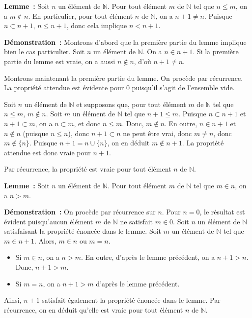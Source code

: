    \done 

\medskip

\noindent\textbf{Lemme :} 
    Soit $n$ un élément de $\mathbb{N}$. 
    Pour tout élément $m$ de $\mathbb{N}$ tel que $n \leq m$, on a $m \notin n$.
    En particulier, pour tout élément $n$ de $\mathbb{N}$, on a $n+1 \neq n$. 
    Puisque $n \subset n+1$, $n \leq n+1$, donc cela implique $n < n+1$. 

\medskip

\noindent\textbf{Démonstration :} 
    Montrons d'abord que la première partie du lemme implique bien le cas particulier. 
    Soit $n$ un élément de $\mathbb{N}$. 
    On a $n \in n+1$. 
    Si la première partie du lemme est vraie, on a aussi $n \notin n$, d'où $n+1 \neq n$.

    Montrons maintenant la première partie du lemme. 
    On procède par récurrence. 
    La propriété attendue est évidente pour $0$ puisqu'il s'agit de l'ensemble vide. 

    Soit $n$ un élément de $\mathbb{N}$ et supposons que, pour tout élément $m$ de $\mathbb{N}$ tel que $n \leq m$, $m \notin n$. 
    Soit $m$ un élément de $\mathbb{N}$ tel que $n+1 \leq m$. 
    Puisque $n \subset n+1$ et $n+1 \subset m$, on a $n \subset m$, et donc $n \leq m$.
    Donc, $m \notin n$. 
    En outre, $n \in n+1$ et $n \notin n$ (puisque $n \leq n$), donc $n+1 \subset n$ ne peut être vrai, donc $m \neq n$, donc $m \notin \lbrace n \rbrace$. 
    Puisque $n+1 = n \cup \lbrace n \rbrace$, on en déduit $m \notin n+1$. 
    La propriété attendue est donc vraie pour $n+1$.

    Par récurrence, la propriété est vraie pour tout élément $n$ de $\mathbb{N}$.

   \done 

\medskip

\noindent\textbf{Lemme :} 
    Soit $n$ un élément de $\mathbb{N}$. 
    Pour tout élément $m$ de $\mathbb{N}$ tel que $m \in n$, on a $n > m$.

\medskip

\noindent\textbf{Démonstration :} 
    On procède par récurrence sur $n$. 
    Pour $n = 0$, le résultat est évident puisqu'aucun élément $m$ de $\mathbb{N}$ ne satisfait $m \in 0$.
    Soit $n$ un élément de $\mathbb{N}$ satisfaisant la propriété énoncée dans le lemme. 
    Soit $m$ un élément de $\mathbb{N}$ tel que $m \in n+1$. 
    Alors, $m \in n$ ou $m = n$.
    \begin{itemize}[nosep]
        \item Si $m \in n$, on a $n > m$.
            En outre, d'après le lemme précédent, on a $n+1 > n$. 
            Donc, $n+1 > m$.
        \item Si $m = n$, on a $n+1 > m$ d'après le lemme précédent.
    \end{itemize}
    Ainsi, $n+1$ satisfait également la propriété énoncée dans le lemme. 
    Par récurrence, on en déduit qu'elle est vraie pour tout élément $n$ de $\mathbb{N}$.
    
